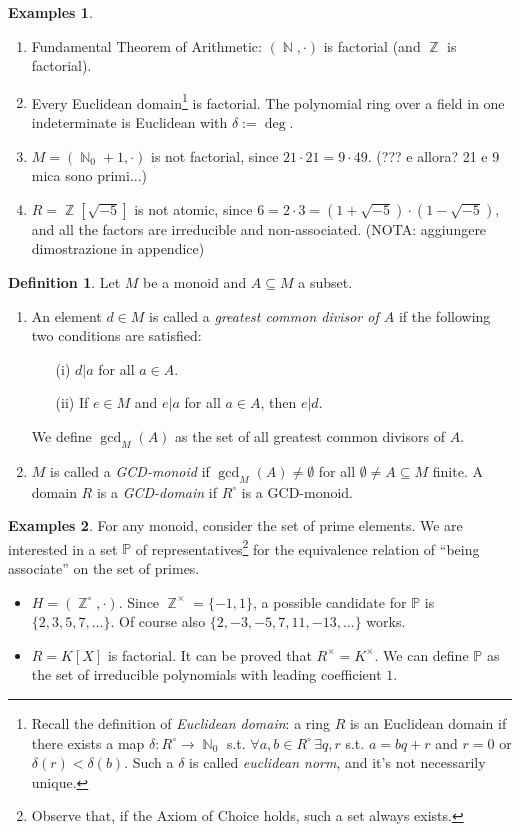 \documentclass[12pt,a4paper]{report}
\theoremstyle{definition}
\newtheorem{defn}[theorem]{Definition}
\newtheorem*{examples}{Examples}
\theoremstyle{num.custom-title}
\DeclareMathOperator{\N}{\mathbb{N}}
\DeclareMathOperator{\Z}{\mathbb{Z}}
\DeclareMathOperator{\sse}{\subseteq}
\renewcommand{\P}{\mathbb{P}}
\begin{document}
\begin{examples}\ 
\begin{enumerate}
\item Fundamental Theorem of Arithmetic: $(\N,\cdot)$ is factorial (and $\Z$ is factorial).
\item Every Euclidean domain\footnote{Recall the definition of \emph{Euclidean domain}: a ring $R$ is an Euclidean domain if there exists a map $\delta : R^\circ \to \N_0$ s.t. $\forall a,b \in R^\circ \, \exists q,r$ s.t. $a=bq+r$ and $r=0$ or $\delta(r) < \delta(b)$. Such a $\delta$ is called \emph{euclidean norm}, and it's not necessarily unique.} is factorial. The polynomial ring over a field in one indeterminate is Euclidean with $\delta:=\deg$.
\item $M=(\N_0+1,\cdot)$ is not factorial, since $21 \cdot 21 = 9 \cdot 49$. (??? e allora? 21 e 9 mica sono primi...)
\item $R=\Z[\sqrt{-5}]$ is not atomic, since $6 = 2 \cdot 3 = (1+\sqrt{-5}) \cdot (1-\sqrt{-5})$, and all the factors are irreducible and non-associated. (NOTA: aggiungere dimostrazione in appendice)
\end{enumerate}
\end{examples}

\begin{defn}
Let $M$ be a monoid and $A \sse M$ a subset.
\begin{enumerate}
\item An element $d \in M$ is called a \emph{greatest common divisor of $A$} if the following two conditions are satisfied:
\begin{enumerate}
\item[(i)] $d|a$ for all $a \in A$.
\item[(ii)] If $e \in M$ and $e|a$ for all $a \in A$, then $e|d$.
\end{enumerate}
We define $\gcd_M (A)$ as the set of all greatest common divisors of $A$.
\item $M$ is called a \emph{GCD-monoid} if $\gcd_M (A) \neq \emptyset$ for all $\emptyset \neq A \sse M$ finite. A domain $R$ is a \emph{GCD-domain} if $R^\circ$ is a GCD-monoid.
\end{enumerate}
\end{defn}

\begin{examples}
For any monoid, consider the set of prime elements. We are interested in a set $\P$ of representatives\footnote{Observe that, if the Axiom of Choice holds, such a set always exists.} for the equivalence relation of ``being associate'' on the set of primes.
\begin{itemize}
\item $H=(\Z^\circ,\cdot)$. Since $\Z^\times=\{-1,1\}$, a possible candidate for $\P$ is $\{2,3,5,7,...\}$. Of course also $\{2,-3,-5,7,11,-13,...\}$ works.
\item $R=K[X]$ is factorial. It can be proved that $R^\times=K^\times$. We can define $\P$ as the set of irreducible polynomials with leading coefficient $1$.
\end{itemize}
\end{examples}
\end{document}
